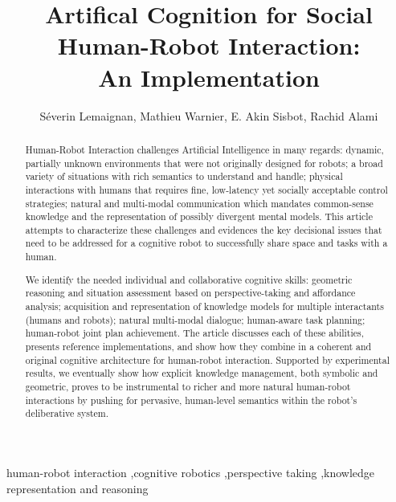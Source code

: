 \documentclass[preprint,3p,times]{elsarticle}
\begin{document}
\begin{frontmatter}

\title{\LARGE \bf
Artifical Cognition for Social Human-Robot Interaction:\\ An Implementation
}

\author{Séverin Lemaignan, Mathieu Warnier, E. Akin Sisbot, Rachid Alami}

\address{
CNRS, LAAS, 7 avenue du Colonel Roche, F-31400 Toulouse, France\\
Univ de Toulouse, LAAS, F-31400 Toulouse, France\\
{\tt firstname.lastname@laas.fr}
}




\begin{abstract}

Human-Robot Interaction challenges Artificial Intelligence in many regards:
dynamic, partially unknown environments that were not originally designed for
robots; a broad variety of situations with rich semantics to understand and
handle; physical interactions with humans that requires fine, low-latency yet
socially acceptable control strategies; natural and multi-modal communication
which mandates common-sense knowledge and the representation of possibly
divergent mental models. This article attempts to characterize these challenges
and evidences the key decisional issues that need to be addressed for a
cognitive robot to successfully share space and tasks with a human.

We identify the needed individual and collaborative cognitive
skills: geometric reasoning and situation assessment based on perspective-taking
and affordance analysis; acquisition and representation of knowledge models for
multiple interactants (humans and robots); natural multi-modal dialogue;
human-aware task planning; human-robot joint plan achievement.  The article
discusses each of these abilities, presents reference implementations, and show
how they combine in a coherent and original cognitive architecture for
human-robot interaction. Supported by experimental results, we eventually show
how explicit knowledge management, both symbolic and geometric, proves to be
instrumental to richer and more natural human-robot interactions by pushing for
pervasive, human-level semantics within the robot's deliberative system.

\end{abstract}

\begin{keyword}
    human-robot interaction \sep cognitive robotics \sep perspective taking \sep knowledge representation and reasoning
\end{keyword}

\end{frontmatter}
\end{document}
